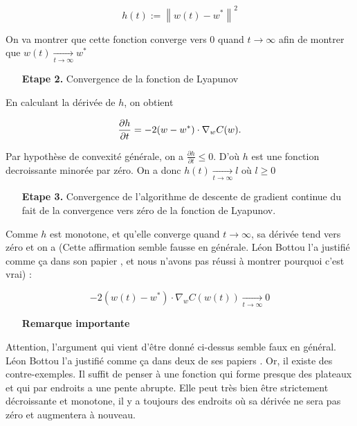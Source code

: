 \documentclass{article}
\begin{document}
\begin{equation*}
    h(t):=\left\|w(t)-w^{*} \right\|^{2}
\end{equation*}

On va montrer que cette fonction converge vers 0 quand $t \longrightarrow \infty$ afin de montrer que $w(t)\underset{t \rightarrow \infty}\longrightarrow w^{*}$
\bigskip

\begin{itemize}     
    \item[\textbf{Etape 2.}] Convergence de la fonction de Lyapunov
\end{itemize}
\bigskip

En calculant la dérivée de $h$, on obtient 

\begin{equation*}
    \frac{\partial h}{\partial t}=-2(w-w^{*})\cdot\nabla_wC(w).\\ 
\end{equation*}

Par hypothèse de convexité générale, on a $\frac{\partial h}{\partial t}\leq0$. D'où $h$ est une fonction decroissante minorée par zéro. On a donc $h(t)\underset{t \rightarrow \infty}\longrightarrow l$ où $l\geq0$
\bigskip

\begin{itemize}    
    \item[\textbf{Etape 3.}] Convergence de l'algorithme de descente de gradient continue du fait de la convergence vers zéro de la fonction de Lyapunov.
\end{itemize}
\bigskip

Comme $h$ est monotone, et qu'elle converge quand $t \rightarrow \infty$, sa dérivée tend vers zéro et on a (Cette affirmation semble fausse en générale. Léon Bottou l'a justifié comme ça dans son papier \cite{bottou-mlss-2004}, et nous n'avons pas réussi à montrer pourquoi c'est vrai) :

\begin{equation*}
     -2(w(t)-w^{*})\cdot\nabla_wC(w(t)) \underset{t \rightarrow \infty} \longrightarrow 0
\end{equation*}

\begin{itemize}
    \item [\textbf{Remarque importante}]
\end{itemize}
\bigskip

Attention, l'argument qui vient d'être donné ci-dessus semble faux en général. Léon Bottou l'a justifié comme ça dans deux de ses papiers \cite{Bottou98on-linelearning} \cite{bottou-mlss-2004}. Or, il existe des contre-exemples. Il suffit de penser à une fonction qui forme presque des plateaux et qui par endroits a une pente abrupte. Elle peut très bien être strictement décroissante et monotone, il y a toujours des endroits où sa dérivée ne sera pas zéro et augmentera à nouveau.
\bigskip 
\end{document}
